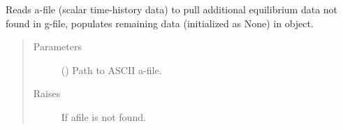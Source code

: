\documentclass[letterpaper,10pt,english]{sphinxmanual}
\begin{document}
\begin{fulllineitems}
\begin{fulllineitems}
\begin{quote}
\begin{description}
\end{description}\end{quote}

\end{fulllineitems}


\begin{fulllineitems}
\label{\detokenize{eqtools:eqtools.eqdskreader.EqdskReader.readAFile}}
Reads a-file (scalar time-history data) to pull additional
equilibrium data not found in g-file, populates remaining data
(initialized as None) in object.
\begin{quote}\begin{description}
\item[{Parameters}] \leavevmode
{} () \textendash{} Path to ASCII a-file.

\item[{Raises}] \leavevmode
{} \textendash{} If afile is not found.

\end{description}\end{quote}

\end{fulllineitems}



\end{fulllineitems}
\end{document}

